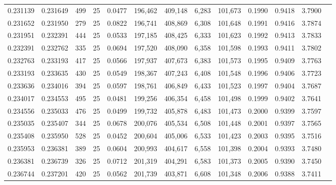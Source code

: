 \begin{tabular}{rrrrrrrrrrrrr}
0.231139 & 0.231649 &   499 &  25 &                                     0.0477 & 196,462 & 409,148 &   6,283 & 101,673 & 0.1990 & 0.9418 & 3.7900 \\
0.231652 & 0.231950 &   279 &  25 &                                     0.0822 & 196,741 & 408,869 &   6,308 & 101,648 & 0.1991 & 0.9416 & 3.7874 \\
0.231951 & 0.232391 &   444 &  25 &                                     0.0533 & 197,185 & 408,425 &   6,333 & 101,623 & 0.1992 & 0.9413 & 3.7833 \\
0.232391 & 0.232762 &   335 &  25 &                                     0.0694 & 197,520 & 408,090 &   6,358 & 101,598 & 0.1993 & 0.9411 & 3.7802 \\
0.232763 & 0.233193 &   417 &  25 &                                     0.0566 & 197,937 & 407,673 &   6,383 & 101,573 & 0.1995 & 0.9409 & 3.7763 \\
0.233193 & 0.233635 &   430 &  25 &                                     0.0549 & 198,367 & 407,243 &   6,408 & 101,548 & 0.1996 & 0.9406 & 3.7723 \\
0.233636 & 0.234016 &   394 &  25 &                                     0.0597 & 198,761 & 406,849 &   6,433 & 101,523 & 0.1997 & 0.9404 & 3.7687 \\
0.234017 & 0.234553 &   495 &  25 &                                     0.0481 & 199,256 & 406,354 &   6,458 & 101,498 & 0.1999 & 0.9402 & 3.7641 \\
0.234556 & 0.235033 &   476 &  25 &                                     0.0499 & 199,732 & 405,878 &   6,483 & 101,473 & 0.2000 & 0.9399 & 3.7597 \\
0.235035 & 0.235407 &   344 &  25 &                                     0.0678 & 200,076 & 405,534 &   6,508 & 101,448 & 0.2001 & 0.9397 & 3.7565 \\
0.235408 & 0.235950 &   528 &  25 &                                     0.0452 & 200,604 & 405,006 &   6,533 & 101,423 & 0.2003 & 0.9395 & 3.7516 \\
0.235953 & 0.236381 &   389 &  25 &                                     0.0604 & 200,993 & 404,617 &   6,558 & 101,398 & 0.2004 & 0.9393 & 3.7480 \\
0.236381 & 0.236739 &   326 &  25 &                                     0.0712 & 201,319 & 404,291 &   6,583 & 101,373 & 0.2005 & 0.9390 & 3.7450 \\
0.236744 & 0.237201 &   420 &  25 &                                     0.0562 & 201,739 & 403,871 &   6,608 & 101,348 & 0.2006 & 0.9388 & 3.7411 \\

\end{tabular}
